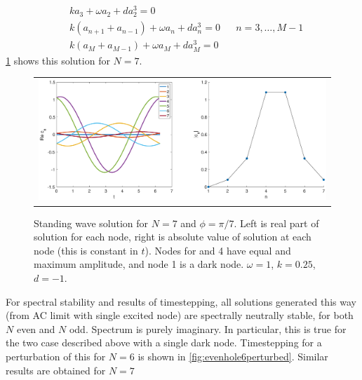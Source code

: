 \documentclass[12pt]{article}
\begin{document}
\begin{equation}\label{eq:twisteqoddhole}
\begin{aligned}
& k a_3 + \omega a_2 + d a_2^3 = 0\\
&k( a_{n+1} + a_{n-1} ) + \omega a_n + d a_n^3 = 0 && n = 3, \dots, M-1 \\
&k ( a_M + a_{M-1} ) + \omega a_M + d a_M^3 = 0
\end{aligned}
\end{equation}
\cref{fig:oddhole7} shows this solution for $N=7$. 
\begin{figure}[H]
\begin{center}
\begin{tabular}{c}
\includegraphics[width=15cm]{images/oddhole7.eps}
\end{tabular}
\end{center}
\caption{Standing wave solution for $N = 7$ and $\phi = \pi/7$. Left is real part of solution for each node, right is absolute value of solution at each node (this is constant in $t$). Nodes for and 4 have equal and maximum amplitude, and node 1 is a dark node. $\omega = 1$, $k = 0.25$, $d=-1$.}
\label{fig:oddhole7}
\end{figure}

For spectral stability and results of timestepping, all solutions generated this way (from AC limit with single excited node) are spectrally neutrally stable, for both $N$ even and $N$ odd. Spectrum is purely imaginary. In particular, this is true for the two case described above with a single dark node. Timestepping for a perturbation of this for $N=6$ is shown in \cref{fig:evenhole6perturbed}. Similar results are obtained for $N=7$
\end{document}
